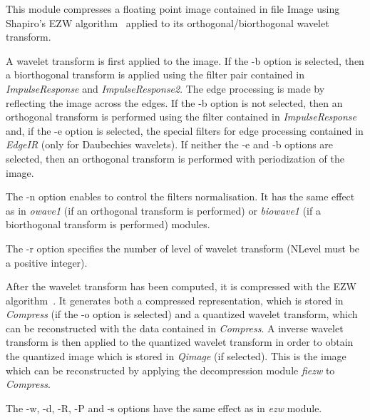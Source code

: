 This module compresses a floating point image contained in file Image using 
Shapiro's EZW algorithm~\cite{shapiro:embedded} applied to its orthogonal/biorthogonal 
wavelet transform. 

A wavelet transform is first applied to the image. If the -b option is 
selected, then a biorthogonal transform is applied using the filter pair 
contained in {\em ImpulseResponse} and {\em ImpulseResponse2}. 
The edge processing is made by reflecting the image across the edges. 
If the -b option is not selected, then an orthogonal transform 
is performed using the filter contained in {\em ImpulseResponse} and, 
if the -e option is selected, the special filters for edge processing 
contained in {\em EdgeIR} (only for Daubechies wavelets). 
If neither the -e and -b options are selected, then an orthogonal transform 
is performed with periodization of the image. 

The -n option enables to control the filters normalisation. It has the same 
effect as in {\em owave1} (if an orthogonal transform is performed) or 
{\em biowave1} (if a biorthogonal transform is performed) modules.

The -r option specifies the number of level of wavelet transform (NLevel 
must be a positive integer). 

After the wavelet transform has been computed, it is compressed 
with the EZW algorithm~\cite{shapiro:embedded}. 
It generates both a compressed representation, 
which is stored in {\em Compress} (if the -o option is selected) and 
a quantized wavelet transform, which can be reconstructed with 
the data contained in {\em Compress}. A inverse wavelet transform is then 
applied to the quantized wavelet transform in order to obtain the quantized 
image which is stored in {\em Qimage} (if selected). This is the image 
which can be reconstructed by applying the decompression module {\em fiezw} 
to {\em Compress}. 

The -w, -d, -R, -P and -s options have the same effect 
as in {\em ezw} module.  


